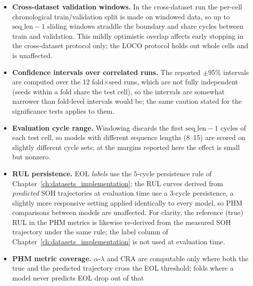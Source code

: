 \begin{itemize}
    during development rather than by the recorded search. The recorded search
    itself is a development-phase artifact (a small TPE study plus the locked
    winning configurations, tuned at hidden size 32; the benchmark hybrids run
    hidden size 64 for headroom) rather than a fully scripted reproduction.
    The design, aggregation and data-volume ablations share the benchmark
    configuration exactly (Section~\ref{sec:ablations}), so no configuration
    discrepancy remains between the two tables.
    \item \textbf{Cross-dataset validation windows.} In the cross-dataset run
    the per-cell chronological train/validation split is made on windowed data,
    so up to $\mathrm{seq\_len}-1$ sliding windows straddle the boundary and
    share cycles between train and validation. This mildly optimistic overlap
    affects early stopping in the cross-dataset protocol only; the LOCO
    protocol holds out whole cells and is unaffected.
    \item \textbf{Confidence intervals over correlated runs.} The reported
    $\pm$95\% intervals are computed over the 12 fold$\times$seed runs, which
    are not fully independent (seeds within a fold share the test cell), so the
    intervals are somewhat narrower than fold-level intervals would be; the same
    caution stated for the significance tests applies to them.
    \item \textbf{Evaluation cycle range.} Windowing discards the first
    $\mathrm{seq\_len}-1$ cycles of each test cell, so models with different
    sequence lengths (8--15) are scored on slightly different cycle sets; at the
    margins reported here the effect is small but nonzero.
    \item \textbf{RUL persistence.} EOL \emph{labels} use the 5-cycle persistence
    rule of Chapter~\ref{ch:datasets_implementation}; the RUL curves derived
    from \emph{predicted} SOH trajectories at evaluation time use a 3-cycle
    persistence, a slightly more responsive setting applied identically to every
    model, so PHM comparisons between models are unaffected. For clarity, the
    reference (true) RUL in the PHM metrics is likewise re-derived from the
    measured SOH trajectory under the same rule; the label column of
    Chapter~\ref{ch:datasets_implementation} is not used at evaluation time.
    \item \textbf{PHM metric coverage.} $\alpha$-$\lambda$ and CRA are
    computable only where both the true and the predicted trajectory cross the
    EOL threshold; folds where a model never predicts EOL drop out of that

\end{itemize}
